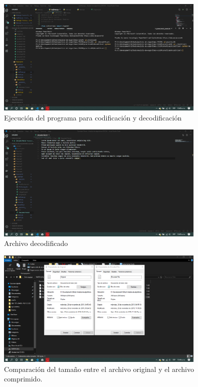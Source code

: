 \documentclass[12pt,twoside]{article}
\begin{document}
\begin{figure}[ht]
    \centering
    \includegraphics[width=10cm,keepaspectratio]{exec_huff.png}
    \caption{Ejecuci\'on del programa para codificaci\'on y decodificaci\'on}
    \label{fig:huff_cuatro}
\end{figure}

\begin{figure}[ht]
    \centering
    \includegraphics[width=10cm,keepaspectratio]{dec_huff.png}
    \caption{Archivo decodificado}
    \label{fig:huff_cinco}
\end{figure}

\begin{figure}[ht]
    \centering
    \includegraphics[width=10cm,keepaspectratio]{comp_huff.png}
    \caption{Comparaci\'on del tama\~no entre el archivo original y el archivo comprimido.}
    \label{fig:hufco}
\end{figure}
\end{document}
